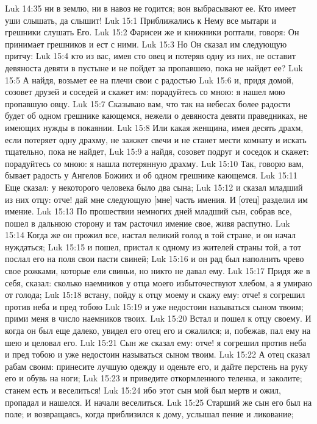 Luk 14:35  ни в землю, ни в навоз не годится; вон выбрасывают ее. Кто имеет уши слышать, да слышит!
Luk 15:1  Приближались к Нему все мытари и грешники слушать Его.
Luk 15:2  Фарисеи же и книжники роптали, говоря: Он принимает грешников и ест с ними.
Luk 15:3  Но Он сказал им следующую притчу:
Luk 15:4  кто из вас, имея сто овец и потеряв одну из них, не оставит девяноста девяти в пустыне и не пойдет за пропавшею, пока не найдет ее?
Luk 15:5  А найдя, возьмет ее на плечи свои с радостью
Luk 15:6  и, придя домой, созовет друзей и соседей и скажет им: порадуйтесь со мною: я нашел мою пропавшую овцу.
Luk 15:7  Сказываю вам, что так на небесах более радости будет об одном грешнике кающемся, нежели о девяноста девяти праведниках, не имеющих нужды в покаянии.
Luk 15:8  Или какая женщина, имея десять драхм, если потеряет одну драхму, не зажжет свечи и не станет мести комнату и искать тщательно, пока не найдет,
Luk 15:9  а найдя, созовет подруг и соседок и скажет: порадуйтесь со мною: я нашла потерянную драхму.
Luk 15:10  Так, говорю вам, бывает радость у Ангелов Божиих и об одном грешнике кающемся.
Luk 15:11  Еще сказал: у некоторого человека было два сына;
Luk 15:12  и сказал младший из них отцу: отче! дай мне следующую [мне] часть имения. И [отец] разделил им имение.
Luk 15:13  По прошествии немногих дней младший сын, собрав все, пошел в дальнюю сторону и там расточил имение свое, живя распутно.
Luk 15:14  Когда же он прожил все, настал великий голод в той стране, и он начал нуждаться;
Luk 15:15  и пошел, пристал к одному из жителей страны той, а тот послал его на поля свои пасти свиней;
Luk 15:16  и он рад был наполнить чрево свое рожками, которые ели свиньи, но никто не давал ему.
Luk 15:17  Придя же в себя, сказал: сколько наемников у отца моего избыточествуют хлебом, а я умираю от голода;
Luk 15:18  встану, пойду к отцу моему и скажу ему: отче! я согрешил против неба и пред тобою
Luk 15:19  и уже недостоин называться сыном твоим; прими меня в число наемников твоих.
Luk 15:20  Встал и пошел к отцу своему. И когда он был еще далеко, увидел его отец его и сжалился; и, побежав, пал ему на шею и целовал его.
Luk 15:21  Сын же сказал ему: отче! я согрешил против неба и пред тобою и уже недостоин называться сыном твоим.
Luk 15:22  А отец сказал рабам своим: принесите лучшую одежду и оденьте его, и дайте перстень на руку его и обувь на ноги;
Luk 15:23  и приведите откормленного теленка, и заколите; станем есть и веселиться!
Luk 15:24  ибо этот сын мой был мертв и ожил, пропадал и нашелся. И начали веселиться.
Luk 15:25  Старший же сын его был на поле; и возвращаясь, когда приблизился к дому, услышал пение и ликование;

